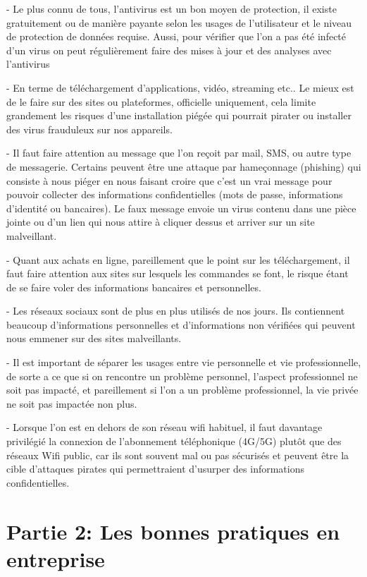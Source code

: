 \documentclass[a4paper,11pt]{article}
\begin{document}
  - Le plus connu de tous, l’antivirus est un bon moyen de protection, il existe gratuitement ou de manière payante selon les usages de l’utilisateur et le niveau de protection de données requise. Aussi, pour vérifier que l’on a pas été infecté d’un virus on peut régulièrement faire des mises à jour et des analyses avec l’antivirus


  - En terme de téléchargement d’applications, vidéo, streaming etc.. Le mieux est de le faire sur des sites ou plateformes, officielle uniquement, cela limite grandement les risques d’une installation piégée qui pourrait pirater ou installer des virus frauduleux sur nos appareils.

  - Il faut faire attention au message que l’on reçoit par mail, SMS, ou autre type de messagerie. Certains peuvent être une attaque par hameçonnage (phishing) qui consiste à nous piéger en nous faisant croire que c’est un vrai message pour pouvoir collecter des informations confidentielles (mots de passe, informations d’identité ou bancaires). Le faux message envoie un virus contenu dans une pièce jointe ou d’un lien qui nous attire à cliquer dessus et arriver sur un site malveillant.

  - Quant aux achats en ligne, pareillement que le point sur les téléchargement, il faut faire attention aux sites sur lesquels les commandes se font, le risque étant de se faire voler des informations bancaires et personnelles.

  - Les réseaux sociaux sont de plus en plus utilisés de nos jours. Ils contiennent beaucoup d’informations personnelles et d’informations non vérifiées qui peuvent nous emmener sur des sites malveillants.

  - Il est important de séparer les usages entre vie personnelle et vie professionnelle, de sorte a ce que si on rencontre un problème personnel, l’aspect professionnel ne soit pas impacté, et pareillement si l’on a un problème professionnel, la vie privée ne soit pas impactée non plus. 

  - Lorsque l’on est en dehors de son réseau wifi habituel, il faut davantage privilégié la connexion de l’abonnement téléphonique (4G/5G) plutôt que des réseaux Wifi public, car ils sont souvent mal ou pas sécurisés et peuvent être la cible d’attaques pirates qui permettraient d’usurper des informations confidentielles.


\section{Partie 2: Les bonnes pratiques en entreprise}
\end{document}

